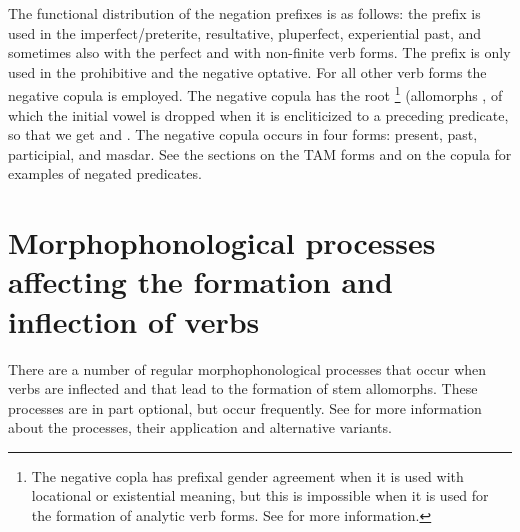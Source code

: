 The functional distribution of the negation prefixes is as follows: the prefix  is used in the imperfect/preterite, resultative, pluperfect, experiential past, and sometimes also with the perfect and with non-finite verb forms. The prefix  is only used in the prohibitive and the negative optative. For all other verb forms the negative copula is employed. The negative copula has the root \footnote{The negative copla has prefixal gender agreement when it is used with locational or existential meaning, but this is impossible when it is used for the formation of analytic verb forms. See  for more information.} (allomorphs , of which the initial vowel is dropped when it is encliticized to a preceding predicate, so that we get  and . The negative copula occurs in four forms: present, past, participial, and masdar. See the sections on the TAM forms and  on the copula for examples of negated predicates.



\section[Morphophonological processes affecting verb formation and inflection]{Morphophonological processes affecting the formation and inflection of verbs}
\label{sec:Morphophonological processes affecting the formation and inflection of verbs}

There are a number of regular morphophonological processes that occur when verbs are inflected and that lead to the formation of stem allomorphs. These processes are in part optional, but occur frequently. See  for more information about the processes, their application and alternative variants.

